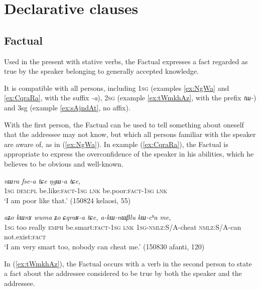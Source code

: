 \documentclass[oldfontcommands,oneside,a4paper,11pt]{article}
\newcommand{\ipa}[1]{{\phon\textit{#1}}} %
\newcommand{\refb}[1]{(\ref{#1})}
\begin{document}
\section{Declarative clauses}


\subsection{Factual}

Used in the present with stative verbs, the Factual expresses a fact regarded as true by the speaker belonging to generally accepted knowledge. 

It is compatible with all persons, including \textsc{1sg} (examples \ref{ex:NgWa} and \ref{ex:CqraRa}, with the suffix \ipa{-a}), \textsc{2sg} (example \ref{ex:tWmkhAz}, with the prefix \ipa{tɯ-}) and 3sg (example \ref{ex:sAjndAt}, no affix).

With the first person, the Factual can be used to tell something about oneself that the addressee may not know, but which all persons familiar with the speaker are aware of, as in \refb{ex:NgWa}. In example \refb{ex:CqraRa}, the Factual is appropriate to express the overconfidence of the speaker in his abilities, which he believes to be obvious and well-known.

\begin{exe}
\ex \label{ex:NgWa}
\gll \ipa{aʑo} 	\ipa{nɯra} 	\ipa{fse-a} 	\ipa{tɕe} 	\ipa{ŋgɯ-a} 	\ipa{tɕe,} \\
\textsc{1sg} \textsc{dem:pl} be.like:\textsc{fact-1sg} \textsc{lnk} be.poor:\textsc{fact-1sg} \textsc{lnk} \\
\glt `I am poor like that.' (150824 kelaosi, 55)
\end{exe}

\begin{exe}
\ex \label{ex:CqraRa}
\gll
\ipa{aʑo} 	\ipa{kɯnɤ} 	\ipa{wuma} 	\ipa{ʑo} 	\ipa{ɕqraʁ-a} 	\ipa{tɕe,} 	\ipa{a-kɯ-nɯβlu} 	\ipa{kɯ-cʰa} \ipa{me,}  \\
\textsc{1sg} too really \textsc{emph} be.smart:\textsc{fact-1sg} \textsc{lnk} \textsc{1sg}-\textsc{nmlz}:S/A-cheat \textsc{nmlz}:S/A-can not.exist:\textsc{fact} \\
\glt `I am very smart too, nobody can cheat me.' (150830 afanti, 120)
\end{exe}

In \refb{ex:tWmkhAz}, the Factual occurs with a verb in the second person to state a fact about the addressee considered to be true by both the speaker and the addressee.
\end{document}

